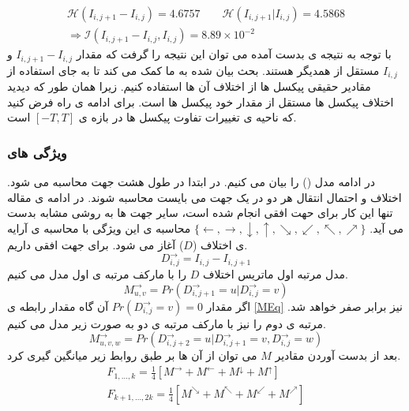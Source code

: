 \begin{eqnarray}
\mathcal{H}(I_{i,j+1}-I_{i,j})=4.6757\qquad\mathcal{H}(I_{i,j+1}|I_{i,j})=4.5868\\
\Longrightarrow\mathcal{I}(I_{i,j+1}-I_{i,j},I_{i,j})=8.89\times 10^{-2} 
\end{eqnarray}
با توجه به نتیجه ی بدست آمده می توان این نتیجه را گرفت که مقدار $ I_{i,j+1}-I_{i,j} $ و $ I_{i,j} $ مستقل از همدیگر هستند.  بحث بیان شده به ما کمک می کند تا به جای استفاده از مقادیر حقیقی پیکسل ها از اختلاف آن ها استفاده کنیم. زیرا همان طور که دیدید اختلاف پیکسل ها مستقل از مقدار خود پیکسل ها است. برای ادامه ی راه فرض کنید که ناحیه ی تغییرات تفاوت پیکسل ها در بازه ی $ [-T,T] $ است. 

\subsubsection{
 ویژگی های {}}
در ادامه مدل {} () را بیان می کنیم. در ابتدا {} در طول هشت جهت محاسبه می شود. اختلاف و احتمال انتقال هر دو در یک جهت می بایست محاسبه شوند. در ادامه ی مقاله تنها این کار برای حهت افقی انجام شده است، سایر جهت ها به روشی مشابه بدست می آید.
 $\{ \leftarrow ,\rightarrow ,\downarrow ,\uparrow ,\searrow ,\swarrow ,\nwarrow ,\nearrow  \} $
محاسبه ی این ویژگی با محاسبه ی آرایه ی اختلاف ($ D $) آغاز می شود. برای جهت افقی داریم.
\begin{equation}
\label{DiffMat}
D^{\rightarrow }_{i,j} = I_{i,j}-I_{i,j+1}
\end{equation}
مدل مرتبه اول  ماتریس اختلاف $ D $ را با مارکف مرتبه ی اول مدل می کنیم. 
\begin{equation}
\label{MEq}
M^{\rightarrow }_{u,v}=Pr(D^{\rightarrow }_{i,j+1}=u|D^{\rightarrow }_{i,j}=v)
\end{equation}
اگر مقدار $ Pr(D^{\rightarrow }_{i,j}=v)=0 $ آن گاه مقدار رابطه ی \ref{MEq} نیز برابر صفر خواهد شد.  مرتبه ی دوم را نیز با مارکف مرتبه ی دو به صورت زیر مدل می کنیم.
\begin{equation}
M^{\rightarrow }_{u,v,w}=Pr(D^{\rightarrow }_{i,j+2}=u|D^{\rightarrow }_{i,j+1}=v,D^{\rightarrow }_{i,j}=w)
\end{equation}
بعد از بدست آوردن مقادیر $ M $ می توان از آن ها بر طبق روابط زیر میانگین گیری کرد.
\begin{eqnarray}
F_{1,\ldots ,k}=\frac{1}{4}[M^{\rightarrow}+M^{\leftarrow}+M^{\downarrow}+M^{\uparrow}]\\
F_{k+1,\ldots ,2k}=\frac{1}{4}[M^{\searrow}+M^{\nwarrow}+M^{\swarrow}+M^{\nearrow}]
\end{eqnarray}
